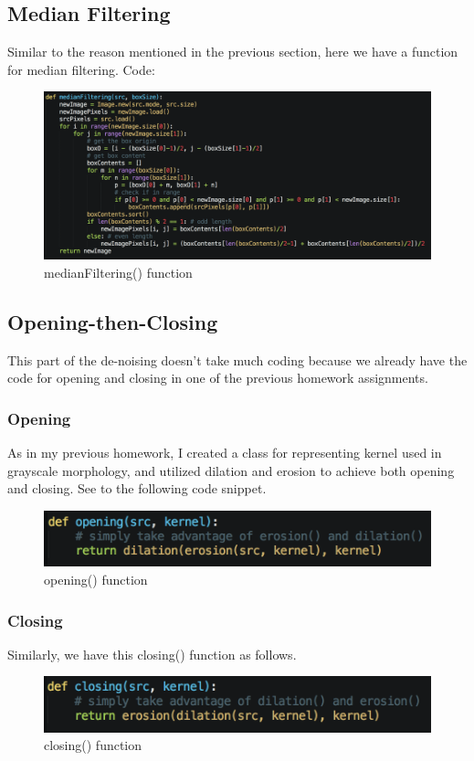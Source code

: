 \documentclass{article}
\begin{document}
\subsection{Median Filtering}
Similar to the reason mentioned in the previous section, here we have a function for median filtering. Code:
\begin{figure}[H]
  \includegraphics[width=\linewidth]{img/median_filtering.png}
  \caption{medianFiltering() function}
  \label{fig:median_filtering}
\end{figure}

\subsection{Opening-then-Closing}
This part of the de-noising doesn't take much coding because we already have the code for opening and closing in one of the previous homework assignments.
\subsubsection{Opening}
As in my previous homework, I created a class for representing kernel used in grayscale morphology, and utilized dilation and erosion to achieve both opening and closing. See to the following code snippet.
\begin{figure}[H]
  \includegraphics[width=\linewidth]{img/opening.png}
  \caption{opening() function}
  \label{fig:opening}
\end{figure}
\subsubsection{Closing}
Similarly, we have this closing() function as follows.
\begin{figure}[H]
  \includegraphics[width=\linewidth]{img/closing.png}
  \caption{closing() function}
  \label{fig:closing}
\end{figure}
\end{document}
